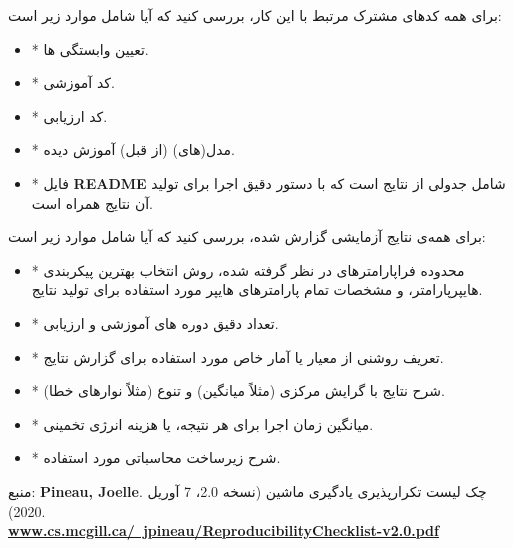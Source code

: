 \begin{tcolorbox}[colback=gray!10,colframe=black,breakable]
    برای همه کدهای مشترک مرتبط با این کار، بررسی کنید که آیا شامل موارد زیر است:
    \begin{itemize}[itemsep=0.2ex]
        \item * تعیین وابستگی ها.
        \item * کد آموزشی.
        \item * کد ارزیابی.
        \item * مدل(های) (از قبل) آموزش دیده.
        \item * فایل \textenglish{\textbf{README}} شامل جدولی از نتایج است که با دستور دقیق اجرا برای تولید آن نتایج همراه است.
        \newline
    \end{itemize}


    برای همه‌ی نتایج آزمایشی گزارش شده، بررسی کنید که آیا شامل موارد زیر است:
    \begin{itemize}[itemsep=0.2ex]
        \item * محدوده فراپارامترهای در نظر گرفته شده، روش انتخاب بهترین پیکربندی هایپرپارامتر، و مشخصات تمام پارامترهای هایپر مورد استفاده برای تولید نتایج.
        \item * تعداد دقیق دوره های آموزشی و ارزیابی.
        \item * تعریف روشنی از معیار یا آمار خاص مورد استفاده برای گزارش نتایج.
        \item * شرح نتایج با گرایش مرکزی (مثلاً میانگین) و تنوع (مثلاً نوارهای خطا).
        \item * میانگین زمان اجرا برای هر نتیجه، یا هزینه انرژی تخمینی.
        \item * شرح زیرساخت محاسباتی مورد استفاده.
        \newline
    \end{itemize}

    منبع: \textenglish{\textbf{Pineau, Joelle}}.
    چک لیست تکرارپذیری یادگیری ماشین (نسخه 2.0، 7 آوریل 2020).
    \\
    \href{https://www.cs.mcgill.ca/~jpineau/ReproducibilityChecklist-v2.0.pdf}{\textenglish{\textbf{www.cs.mcgill.ca/~jpineau/ReproducibilityChecklist-v2.0.pdf}}}

\end{tcolorbox}


